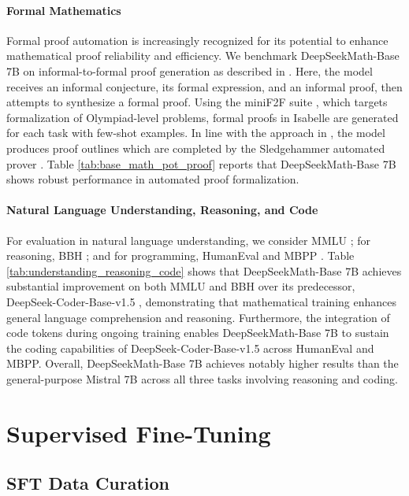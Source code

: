 \paragraph{Formal Mathematics}

Formal proof automation is increasingly recognized for its potential to enhance mathematical proof reliability and efficiency. We benchmark DeepSeekMath-Base 7B on informal-to-formal proof generation as described in \citep{dsp_proof}. Here, the model receives an informal conjecture, its formal expression, and an informal proof, then attempts to synthesize a formal proof. Using the miniF2F suite \citep{minif2f}, which targets formalization of Olympiad-level problems, formal proofs in Isabelle are generated for each task with few-shot examples. In line with the approach in \cite{dsp_proof}, the model produces proof outlines which are completed by the Sledgehammer automated prover \citep{sledgehammer}. Table \ref{tab:base_math_pot_proof} reports that DeepSeekMath-Base 7B shows robust performance in automated proof formalization.

\paragraph{Natural Language Understanding, Reasoning, and Code}

For evaluation in natural language understanding, we consider MMLU \citep{mmlu}; for reasoning, BBH \citep{bbh}; and for programming, HumanEval \citep{codex} and MBPP \citep{mbpp}. Table \ref{tab:understanding_reasoning_code} shows that DeepSeekMath-Base 7B achieves substantial improvement on both MMLU and BBH over its predecessor, DeepSeek-Coder-Base-v1.5 \citep{deepseek-coder}, demonstrating that mathematical training enhances general language comprehension and reasoning. Furthermore, the integration of code tokens during ongoing training enables DeepSeekMath-Base 7B to sustain the coding capabilities of DeepSeek-Coder-Base-v1.5 across HumanEval and MBPP. Overall, DeepSeekMath-Base 7B achieves notably higher results than the general-purpose Mistral 7B \citep{mistral} across all three tasks involving reasoning and coding.

\section{Supervised Fine-Tuning}

\subsection{SFT Data Curation}

